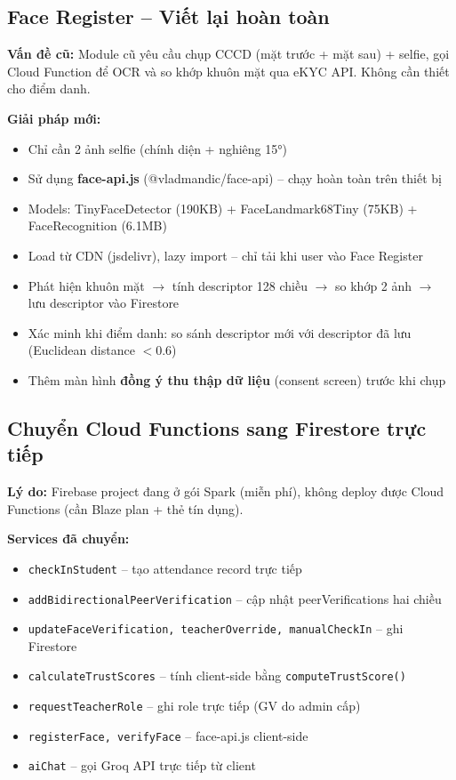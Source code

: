 \documentclass{article}
\begin{document}
\subsection{Face Register -- Viết lại hoàn toàn}

\textbf{Vấn đề cũ:} Module cũ yêu cầu chụp CCCD (mặt trước + mặt sau) + selfie, gọi Cloud Function để OCR và so khớp khuôn mặt qua eKYC API. Không cần thiết cho điểm danh.

\textbf{Giải pháp mới:}
\begin{itemize}[leftmargin=1.5em]
  \item Chỉ cần 2 ảnh selfie (chính diện + nghiêng 15°)
  \item Sử dụng \textbf{face-api.js} (@vladmandic/face-api) -- chạy hoàn toàn trên thiết bị
  \item Models: TinyFaceDetector (190KB) + FaceLandmark68Tiny (75KB) + FaceRecognition (6.1MB)
  \item Load từ CDN (jsdelivr), lazy import -- chỉ tải khi user vào Face Register
  \item Phát hiện khuôn mặt $\rightarrow$ tính descriptor 128 chiều $\rightarrow$ so khớp 2 ảnh $\rightarrow$ lưu descriptor vào Firestore
  \item Xác minh khi điểm danh: so sánh descriptor mới với descriptor đã lưu (Euclidean distance $< 0.6$)
  \item Thêm màn hình \textbf{đồng ý thu thập dữ liệu} (consent screen) trước khi chụp
\end{itemize}

\subsection{Chuyển Cloud Functions sang Firestore trực tiếp}

\textbf{Lý do:} Firebase project đang ở gói Spark (miễn phí), không deploy được Cloud Functions (cần Blaze plan + thẻ tín dụng).

\textbf{Services đã chuyển:}
\begin{itemize}[leftmargin=1.5em]
  \item \texttt{checkInStudent} -- tạo attendance record trực tiếp
  \item \texttt{addBidirectionalPeerVerification} -- cập nhật peerVerifications hai chiều
  \item \texttt{updateFaceVerification, teacherOverride, manualCheckIn} -- ghi Firestore
  \item \texttt{calculateTrustScores} -- tính client-side bằng \texttt{computeTrustScore()}
  \item \texttt{requestTeacherRole} -- ghi role trực tiếp (GV do admin cấp)
  \item \texttt{registerFace, verifyFace} -- face-api.js client-side
  \item \texttt{aiChat} -- gọi Groq API trực tiếp từ client
\end{itemize}
\end{document}
